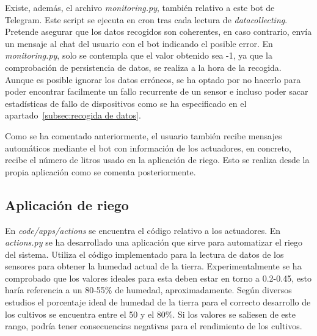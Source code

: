 \documentclass[a4paper, 12pt, oneside]{book}
\begin{document}
Existe, además, el archivo \textit{monitoring.py}, también relativo a este bot de Telegram. Este script se ejecuta en cron tras cada lectura de \textit{datacollecting}. Pretende asegurar que los datos recogidos son coherentes, en caso contrario, envía un mensaje al chat del usuario con el bot indicando el posible error. En \textit{monitoring.py}, solo se contempla que el valor obtenido sea -1, ya que la comprobación de persistencia de datos, se realiza a la hora de la recogida. Aunque es posible ignorar los datos erróneos, se ha optado por no hacerlo para poder encontrar facilmente un fallo recurrente de un sensor e incluso poder sacar estadísticas de fallo de dispositivos como se ha especificado en el apartado~\ref{subsec:recogida de datos}.

Como se ha comentado anteriormente, el usuario también recibe mensajes automáticos mediante el bot con información de los actuadores, en concreto, recibe el número de litros usado en la aplicación de riego. Esto se realiza desde la propia aplicación como se comenta posteriormente.




\subsection{Aplicación de riego}
\label{subsec:riego}
En \textit{code/apps/actions} se encuentra el código relativo a los actuadores. En \textit{actions.py} se ha desarrollado una aplicación que sirve para automatizar el riego del sistema. Utiliza el código implementado para la lectura de datos de los sensores para obtener la humedad actual de la tierra. Experimentalmente se ha comprobado que los valores ideales para esta deben estar en torno a 0.2-0.45, esto haría referencia a un 80-55\% de humedad, aproximadamente. Según diversos estudios\cite{cultivos_humedad} el porcentaje ideal de humedad de la tierra para el correcto desarrollo de los cultivos se encuentra entre el 50 y el 80\%. Si los valores se saliesen de este rango, podría tener consecuencias negativas para el rendimiento de los cultivos. 
\end{document}
